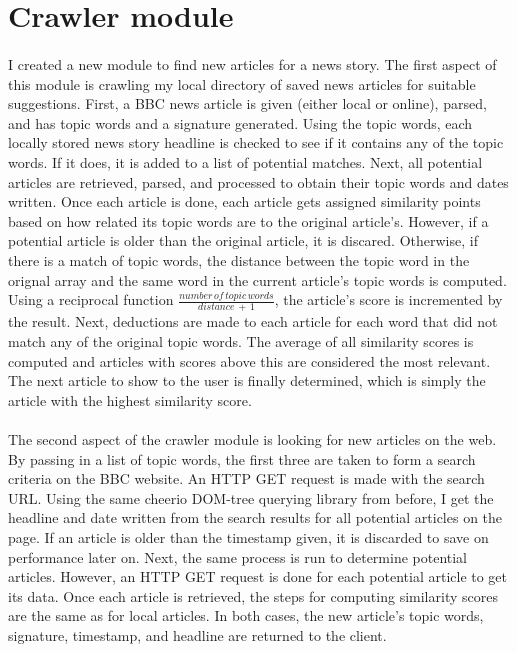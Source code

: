 \documentclass[11pt]{article}
\begin{document}
\section{Crawler module}
\paragraph{}
I created a new module to find new articles for a news story. The first aspect of this module is crawling my local directory of saved news articles for suitable suggestions. First, a BBC news article is given (either local or online), parsed, and has topic words and a signature generated. Using the topic words, each locally stored news story headline is checked to see if it contains any of the topic words. If it does, it is added to a list of potential matches. Next, all potential articles are retrieved, parsed, and processed to obtain their topic words and dates written. Once each article is done, each article gets assigned similarity points based on how related its topic words are to the original article's. However, if a potential article is older than the original article, it is discared. Otherwise, if there is a match of topic words, the distance between the topic word in the orignal array and the same word in the current article's topic words is computed. Using a reciprocal function $\frac{number\,of\,topic\,words}{distance\,+\,1}$, the article's score is incremented by the result. Next, deductions are made to each article for each word that did not match any of the original topic words. The average of all similarity scores is computed and articles with scores above this are considered the most relevant. The next article to show to the user is finally determined, which is simply the article with the highest similarity score.
\paragraph{}
The second aspect of the crawler module is looking for new articles on the web. By passing in a list of topic words, the first three are taken to form a search criteria on the BBC website. An HTTP GET request is made with the search URL. Using the same cheerio DOM-tree querying library from before, I get the headline and date written from the search results for all potential articles on the page. If an article is older than the timestamp given, it is discarded to save on performance later on. Next, the same process is run to determine potential articles. However, an HTTP GET request is done for each potential article to get its data. Once each article is retrieved, the steps for computing similarity scores are the same as for local articles. In both cases, the new article's topic words, signature, timestamp, and headline are returned to the client.
\end{document}

